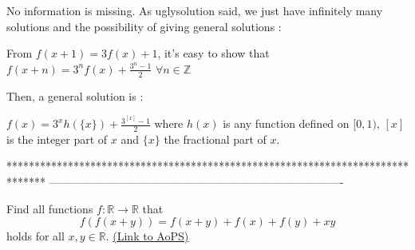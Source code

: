\begin{solution}
	No information is missing.
As uglysolution said, we just have infinitely many solutions and the possibility of giving general solutions :

From $ f(x+1)=3f(x)+1$, it's easy to show that $ f(x+n)=3^nf(x)+\frac{3^n-1}{2}$ $ \forall n\in\mathbb Z$

Then, a general solution is :

$ f(x)=3^xh(\{x\})+\frac{3^{[x]}-1}{2}$  where $ h(x)$ is any function defined on $ [0,1)$, $ [x]$ is the integer part of $ x$ and $ \{x\}$ the fractional part of $ x$.
\end{solution}
*******************************************************************************
-------------------------------------------------------------------------------

\begin{problem}
	Find all functions $f: \mathbb R \to \mathbb R$ that \[f(f(x+y))=f(x+y)+f(x)+f(y)+xy\] holds for all $x,y \in \mathbb R$.
	\flushright \href{https://artofproblemsolving.com/community/c6h293642}{(Link to AoPS)}
\end{problem}




